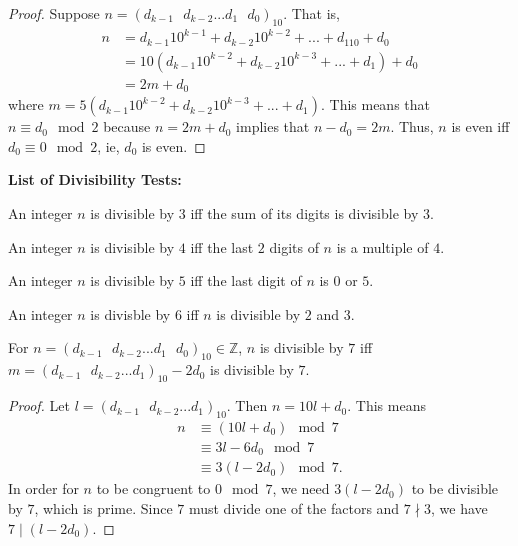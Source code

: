 \begin{proof}
Suppose $n = (d_{k-1} \text{  } d_{k-2} ... d_1 \text{  } d_0)_{10}$. That is,
\begin{align*}
n &= d_{k-1}10^{k-1} + d_{k-2}10^{k-2} + ... + d_110 + d_0 \\
&= 10(d_{k-1}10^{k-2} + d_{k-2}10^{k-3} + ... + d_1) + d_0 \\
&= 2m + d_0
\end{align*}
where $m = 5(d_{k-1}10^{k-2} + d_{k-2}10^{k-3} + ... + d_1)$.
This means that $n \equiv d_0 \mod{2}$ because $n=2m + d_0$ implies that $n-d_0 = 2m$. Thus, $n$ is even iff $d_0 \equiv 0 \mod{2}$, ie, $d_0$ is even.
\end{proof}

\bigskip
\noindent
\textbf{List of Divisibility Tests:}

\begin{theorem}
An integer $n$ is divisible by $3$ iff the sum of its digits is divisible by $3$.
\end{theorem}

\begin{theorem}
An integer $n$ is divisible by $4$ iff the last $2$ digits of $n$ is a multiple of $4$.
\end{theorem}

\begin{theorem}
An integer $n$ is divisible by $5$ iff the last digit of $n$ is $0$ or $5$.
\end{theorem}

\begin{theorem}
An integer $n$ is divisble by $6$ iff $n$ is divisible by $2$ and $3$.
\end{theorem}

\begin{theorem}
For $n = (d_{k-1} \text{  } d_{k-2} ... d_1 \text{  } d_0)_{10} \in \mathbb{Z}$, $n$ is divisible by $7$ iff $m=(d_{k-1} \text {  } d_{k-2} ... d_1)_{10} - 2d_0$ is divisible by $7$.
\end{theorem}

\begin{proof}
Let $l = (d_{k-1} \text{  } d_{k-2} ... d_1)_{10}$. Then $n = 10l + d_0$. This means
\begin{align*}
n &\equiv (10l + d_0) \mod{7} \\
&\equiv 3l - 6d_0 \mod{7} \\
&\equiv 3(l-2d_0) \mod{7}.
\end{align*}
In order for $n$ to be congruent to $0 \mod{7}$, we need $3(l-2d_0)$ to be divisible by $7$, which is prime. Since $7$ must divide one of the factors and $7 \nmid 3$, we have $7 \mid (l-2d_0)$.
\end{proof}

